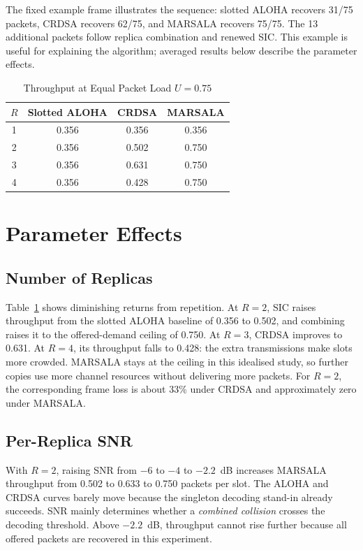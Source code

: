\documentclass[conference]{IEEEtran}
\begin{document}
The fixed example frame illustrates the sequence: slotted ALOHA recovers
31/75 packets, CRDSA recovers 62/75, and MARSALA recovers 75/75. The 13
additional packets follow replica combination and renewed SIC. This example
is useful for explaining the algorithm; averaged results below describe the
parameter effects.

\begin{table}[t]
\caption{Throughput at Equal Packet Load $U=0.75$}
\label{tab:replicas}
\centering
\begin{tabular}{cccc}
\toprule
$R$ & Slotted ALOHA & CRDSA & MARSALA \\
\midrule
1 & 0.356 & 0.356 & 0.356 \\
2 & 0.356 & 0.502 & 0.750 \\
3 & 0.356 & 0.631 & 0.750 \\
4 & 0.356 & 0.428 & 0.750 \\
\bottomrule
\end{tabular}
\end{table}

\section{Parameter Effects}
\subsection{Number of Replicas}
Table~\ref{tab:replicas} shows diminishing returns from repetition. At
$R=2$, SIC raises throughput from the slotted ALOHA baseline of 0.356 to
0.502, and combining raises it to the offered-demand ceiling of 0.750. At
$R=3$, CRDSA improves to 0.631. At $R=4$, its throughput falls to 0.428:
the extra transmissions make slots more crowded. MARSALA stays at the
ceiling in this idealised study, so further copies use more channel resources
without delivering more packets. For $R=2$, the corresponding frame loss is
about 33\% under CRDSA and approximately zero under MARSALA.

\subsection{Per-Replica SNR}
With $R=2$, raising SNR from $-6$ to $-4$ to $-2.2$~dB increases MARSALA
throughput from 0.502 to 0.633 to 0.750 packets per slot. The ALOHA and
CRDSA curves barely move because the singleton decoding stand-in already
succeeds. SNR mainly determines whether a \emph{combined collision} crosses
the decoding threshold. Above $-2.2$~dB, throughput cannot rise further
because all offered packets are recovered in this experiment.
\end{document}
